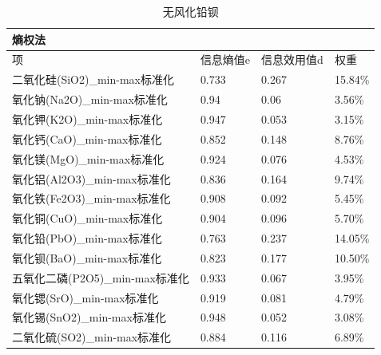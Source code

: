 \documentclass[UTF8]{ctexart}
\begin{document}
\begin{table}[H]
    \centering
    \caption{无风化铅钡}
    \begin{tabular}{|l|l|l|l|}
        \hline
        熵权法                          & ~         & ~           & ~       \\ \hline
        项                              & 信息熵值e & 信息效用值d & 权重    \\ \hline
        二氧化硅(SiO2)\_min-max标准化   & 0.733     & 0.267       & 15.84\% \\ \hline
        氧化钠(Na2O)\_min-max标准化     & 0.94      & 0.06        & 3.56\%  \\ \hline
        氧化钾(K2O)\_min-max标准化      & 0.947     & 0.053       & 3.15\%  \\ \hline
        氧化钙(CaO)\_min-max标准化      & 0.852     & 0.148       & 8.76\%  \\ \hline
        氧化镁(MgO)\_min-max标准化      & 0.924     & 0.076       & 4.53\%  \\ \hline
        氧化铝(Al2O3)\_min-max标准化    & 0.836     & 0.164       & 9.74\%  \\ \hline
        氧化铁(Fe2O3)\_min-max标准化    & 0.908     & 0.092       & 5.45\%  \\ \hline
        氧化铜(CuO)\_min-max标准化      & 0.904     & 0.096       & 5.70\%  \\ \hline
        氧化铅(PbO)\_min-max标准化      & 0.763     & 0.237       & 14.05\% \\ \hline
        氧化钡(BaO)\_min-max标准化      & 0.823     & 0.177       & 10.50\% \\ \hline
        五氧化二磷(P2O5)\_min-max标准化 & 0.933     & 0.067       & 3.95\%  \\ \hline
        氧化锶(SrO)\_min-max标准化      & 0.919     & 0.081       & 4.79\%  \\ \hline
        氧化锡(SnO2)\_min-max标准化     & 0.948     & 0.052       & 3.08\%  \\ \hline
        二氧化硫(SO2)\_min-max标准化    & 0.884     & 0.116       & 6.89\%  \\ \hline
    \end{tabular}
\end{table}
\end{document}
